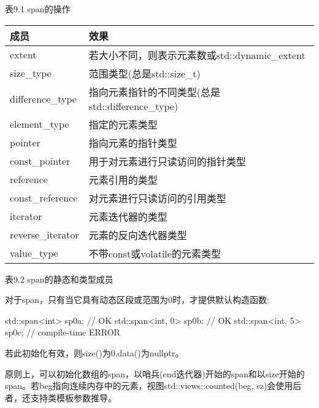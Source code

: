 \begin{center}
表9.1 span的操作
\end{center}

\begin{longtable}[c]{|l|l|}
\hline
\textbf{成员} & \textbf{效果}                      \\ \hline
\endfirsthead
%
\endhead
%
extent            & 若大小不同，则表示元素数或std::dynamic\_extent              \\ \hline
size\_type      & 范围类型(总是std::size\_t) \\ \hline
difference\_type  & 指向元素指针的不同类型(总是std::difference\_type) \\ \hline
element\_type   & 指定的元素类型       \\ \hline
pointer         & 指向元素的指针类型    \\ \hline
const\_pointer    & 用于对元素进行只读访问的指针类型                 \\ \hline
reference       & 元素引用的类型  \\ \hline
const\_reference  & 对元素进行只读访问的引用类型               \\ \hline
iterator        & 元素迭代器的类型  \\ \hline
reverse\_iterator & 元素的反向迭代器类型                             \\ \hline
value\_type       & 不带const或volatile的元素类型                            \\ \hline
\end{longtable}

\begin{center}
表9.2 span的静态和类型成员
\end{center}


对于span，只有当它具有动态区段或范围为0时，才提供默认构造函数:

\begin{cpp}
std::span<int> sp0a; // OK
std::span<int, 0> sp0b; // OK
std::span<int, 5> sp0c; // compile-time ERROR
\end{cpp}

若此初始化有效，则size()为0,data()为nullptr。

原则上，可以初始化数组的span，以哨兵(end迭代器)开始的span和以size开始的span。若beg指向连续内存中的元素，视图std::views::counted(beg, sz)会使用后者，还支持类模板参数推导。

